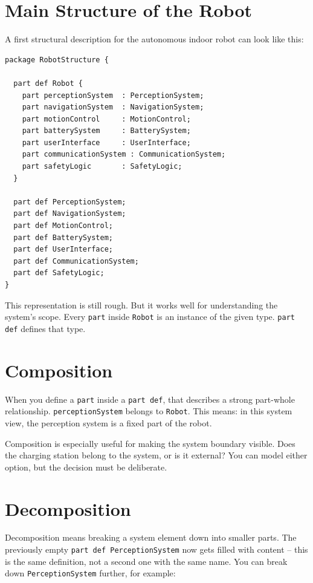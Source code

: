 \section{Main Structure of the Robot}
A first structural description for the autonomous indoor robot can look like this:

\begin{lstlisting}
package RobotStructure {

  part def Robot {
    part perceptionSystem  : PerceptionSystem;
    part navigationSystem  : NavigationSystem;
    part motionControl     : MotionControl;
    part batterySystem     : BatterySystem;
    part userInterface     : UserInterface;
    part communicationSystem : CommunicationSystem;
    part safetyLogic       : SafetyLogic;
  }

  part def PerceptionSystem;
  part def NavigationSystem;
  part def MotionControl;
  part def BatterySystem;
  part def UserInterface;
  part def CommunicationSystem;
  part def SafetyLogic;
}
\end{lstlisting}

This representation is still rough. But it works well for understanding the system's scope. Every \texttt{part} inside \texttt{Robot} is an instance of the given type. \texttt{part def} defines that type.

\section{Composition}
When you define a \texttt{part} inside a \texttt{part def}, that describes a strong part-whole relationship. \texttt{perceptionSystem} belongs to \texttt{Robot}. This means: in this system view, the perception system is a fixed part of the robot.

Composition is especially useful for making the system boundary visible. Does the charging station belong to the system, or is it external? You can model either option, but the decision must be deliberate.

\section{Decomposition}
Decomposition means breaking a system element down into smaller parts. The previously empty \texttt{part def PerceptionSystem} now gets filled with content -- this is the same definition, not a second one with the same name. You can break down \texttt{PerceptionSystem} further, for example:

